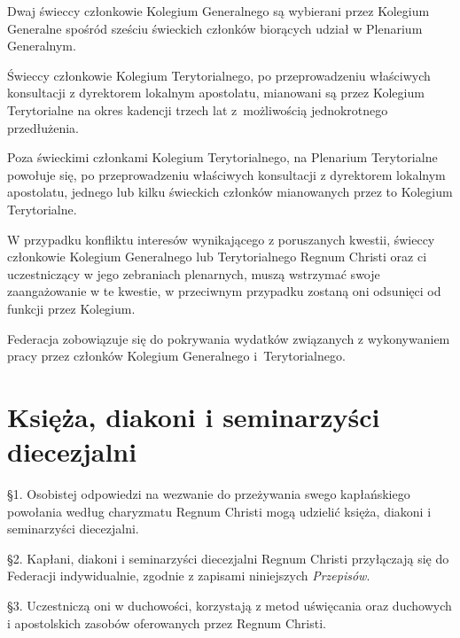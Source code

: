 
 Dwaj świeccy członkowie Kolegium Generalnego są wybierani przez Kolegium Generalne spośród sześciu świeckich członków biorących udział w Plenarium Generalnym.


 Świeccy członkowie Kolegium Terytorialnego, po przeprowadzeniu właściwych konsultacji z dyrektorem lokalnym apostolatu, mianowani są przez Kolegium Terytorialne na okres kadencji trzech lat \mbox{z możliwością} jednokrotnego przedłużenia.


 Poza świeckimi członkami Kolegium Terytorialnego, na Plenarium Terytorialne powołuje się, po przeprowadzeniu właściwych konsultacji z dyrektorem lokalnym apostolatu, jednego lub kilku świeckich członków mianowanych przez to Kolegium Terytorialne.


 W przypadku konfliktu interesów wynikającego z poruszanych kwestii, świeccy członkowie Kolegium Generalnego lub Terytorialnego Regnum Christi oraz ci uczestniczący w jego zebraniach plenarnych, muszą wstrzymać swoje zaangażowanie w te kwestie, w przeciwnym przypadku zostaną oni odsunięci od funkcji przez Kolegium.


 Federacja zobowiązuje się do pokrywania wydatków związanych z wykonywaniem pracy przez członków Kolegium Generalnego \mbox{i Terytorialnego}.

\part{Księża, diakoni i seminarzyści diecezjalni}


 \S{}1. Osobistej odpowiedzi na wezwanie do przeżywania swego kapłańskiego powołania według charyzmatu Regnum Christi mogą udzielić księża, diakoni i seminarzyści diecezjalni. 

\S{}2. Kapłani, diakoni i seminarzyści diecezjalni Regnum Christi przyłączają się do Federacji indywidualnie, zgodnie z zapisami niniejszych {\em Przepisów}.

\S{}3. Uczestniczą oni w duchowości, korzystają z metod uświęcania oraz duchowych i apostolskich zasobów oferowanych przez Regnum Christi.

